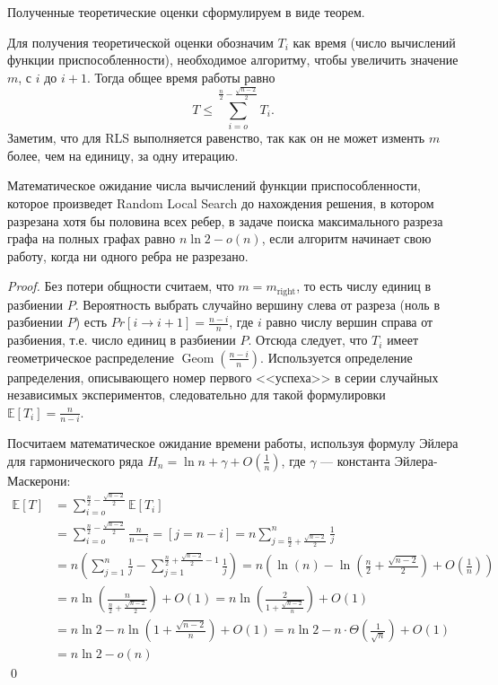 \documentclass[times]{itmo-student-thesis}
\DeclareMathOperator{\Geom}{Geom}
\begin{document}
Полученные теоретические оценки сформулируем в виде теорем.


Для получения теоретической оценки обозначим $T_i$ как время (число вычислений функции приспособленности), необходимое алгоритму, чтобы увеличить значение $m$, с $i$ до $i + 1$.
Тогда общее время работы равно
$$
  T \le \sum_{i=o}^{\frac{n}{2} - \frac{\sqrt{n-2}}{2}} T_i.
$$
Заметим, что для RLS выполняется равенство, так как он не может изменть $m$ более, чем на единицу, за одну итерацию.

\begin{theorem} \label{thm:rls}
  Математическое ожидание числа вычислений функции приспособленности, которое произведет Random Local Search до нахождения решения, в котором разрезана хотя бы половина всех ребер, в задаче поиска максимального разреза графа на полных графах равно $n\ln 2 - o(n)$, если алгоритм начинает свою работу, когда ни одного ребра не разрезано.
\end{theorem}

\begin{proof}
  Без потери общности считаем, что $m = m_{\text{right}}$, то есть числу единиц в разбиении $P$.
  Вероятность выбрать случайно вершину слева от разреза (ноль в разбиении $P$) есть $Pr[i \rightarrow i + 1] = \frac{n-i}{n}$, где $i$ равно числу вершин справа от разбиения, т.е. число единиц в разбиении $P$.
  Отсюда следует, что  $T_i$ имеет геометрическое распределение $\Geom(\frac{n-i}{n})$. Используется определение рапределения, описывающего номер первого <<успеха>> в серии случайных независимых экспериментов, следовательно для такой формулировки $\mathbb{E}[T_i] = \frac{n}{n-i}$.

  Посчитаем математическое ожидание времени работы, используя формулу Эйлера для гармонического ряда $H_n = \ln n + \gamma + O(\frac{1}{n})$, где $\gamma$ --- константа Эйлера-Маскерони:
  \begin{align*}
      \mathbb{E}[T] &=
                  \sum_{i=o}^{\frac{n}{2} - \frac{\sqrt{n-2}}{2}} \mathbb{E}[T_i] \\
          &=
                  \sum_{i=o}^{\frac{n}{2} - \frac{\sqrt{n-2}}{2}} \frac{n}{n-i} = [j = n - i] = n \sum_{j=\frac{n}{2} + \frac{\sqrt{n-2}}{2}}^{n} \frac{1}{j}  \\
          &=      n \left(\sum_{j=1}^{n}\frac{1}{j} - \sum_{j=1}^{\frac{n}{2} +  \frac{\sqrt{n-2}}{2} - 1} \frac{1}{j} \right) =
                  n\left(\ln(n) - \ln\left(\frac{n}{2} + \frac{\sqrt{n-2}}{2}\right) + O\left(\frac{1}{n}\right) \right) \\
          &=
                  n \ln\left(\frac{n}{\frac{n}{2} + \frac{\sqrt{n-2}}{2}}\right) + O(1) = n \ln\left(\frac{2}{1 + \frac{\sqrt{n-2}}{n}}\right) + O(1) \\
          &= n\ln2 - n\ln\left(1 + \frac{\sqrt{n-2}}{n}\right) + O(1) = n\ln2 - n\cdot\Theta\left(\frac{1}{\sqrt{n}}\right) + O(1) \\
          &= n\ln2 - o(n)
  \end{align*}
  \qed
\end{proof}
\end{document}
